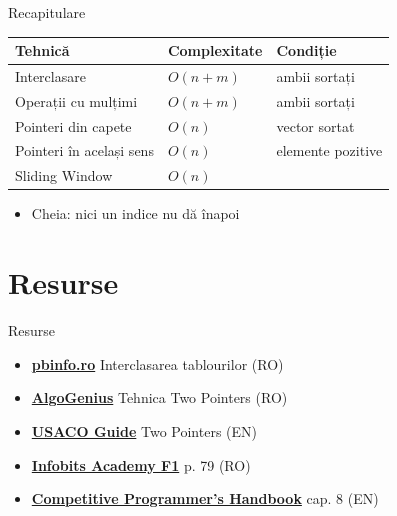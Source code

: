 \documentclass{beamer}
\begin{document}
\begin{frame}{Recapitulare}
  \begin{center}
  \begin{tabular}{lll}
    \toprule
    Tehnică & Complexitate & Condiție \\
    \midrule
    Interclasare           & $O(n+m)$ & ambii sortați \\
    Operații cu mulțimi    & $O(n+m)$ & ambii sortați \\
    Pointeri din capete      & $O(n)$   & vector sortat \\
    Pointeri în același sens & $O(n)$   & elemente pozitive \\
    Sliding Window     & $O(n)$   & \textemdash{} \\
    \bottomrule
  \end{tabular}
  \end{center}

  \begin{itemize}
    \item Cheia: nici un indice nu dă înapoi
  \end{itemize}
\end{frame}

\section{Resurse}

\begin{frame}{Resurse}
  \begin{itemize}\itemsep6pt
    \item \href{https://www.pbinfo.ro/articole/5588/interclasarea-tablourilor}{\textbf{pbinfo.ro}} \textemdash{} Interclasarea tablourilor (RO)
    \item \href{https://old.algogenius.ro/two-pointers/}{\textbf{AlgoGenius}} \textemdash{} Tehnica Two Pointers (RO)
    \item \href{https://usaco.guide/silver/two-pointers?lang=cpp}{\textbf{USACO Guide}} \textemdash{} Two Pointers (EN)
    \item \href{https://cdn.sepi.ro/infobits-f1.pdf}{\textbf{Infobits Academy F1}} \textemdash{} p. 79 (RO)
    \item \href{https://cses.fi/book/book.pdf}{\textbf{Competitive Programmer's Handbook}} \textemdash{} cap. 8 (EN)
  \end{itemize}
\end{frame}
\end{document}
